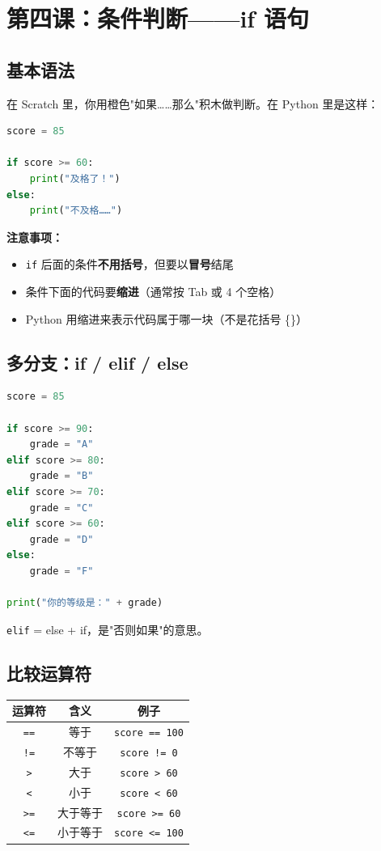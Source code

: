 \documentclass[a4paper,12pt]{ctexart}
\begin{document}
\section*{第四课：条件判断——if 语句}

\subsection*{基本语法}

在 Scratch 里，你用橙色"如果……那么"积木做判断。在 Python 里是这样：

\begin{lstlisting}[language=Python]
score = 85

if score >= 60:
    print("及格了！")
else:
    print("不及格……")
\end{lstlisting}

\textbf{注意事项：}
\begin{itemize}
  \item \texttt{if} 后面的条件\textbf{不用括号}，但要以\textbf{冒号}结尾
  \item 条件下面的代码要\textbf{缩进}（通常按 Tab 或 4 个空格）
  \item Python 用缩进来表示代码属于哪一块（不是花括号 \{\}）
\end{itemize}

\subsection*{多分支：if / elif / else}

\begin{lstlisting}[language=Python]
score = 85

if score >= 90:
    grade = "A"
elif score >= 80:
    grade = "B"
elif score >= 70:
    grade = "C"
elif score >= 60:
    grade = "D"
else:
    grade = "F"

print("你的等级是：" + grade)
\end{lstlisting}

\texttt{elif} = else + if，是"否则如果"的意思。

\subsection*{比较运算符}

\begin{center}
\begin{tabular}{|c|c|c|}
\hline
\textbf{运算符} & \textbf{含义} & \textbf{例子} \\ \hline
\texttt{==} & 等于 & \texttt{score == 100} \\ \hline
\texttt{!=} & 不等于 & \texttt{score != 0} \\ \hline
\texttt{>} & 大于 & \texttt{score > 60} \\ \hline
\texttt{<} & 小于 & \texttt{score < 60} \\ \hline
\texttt{>=} & 大于等于 & \texttt{score >= 60} \\ \hline
\texttt{<=} & 小于等于 & \texttt{score <= 100} \\ \hline
\end{tabular}
\end{center}
\end{document}
